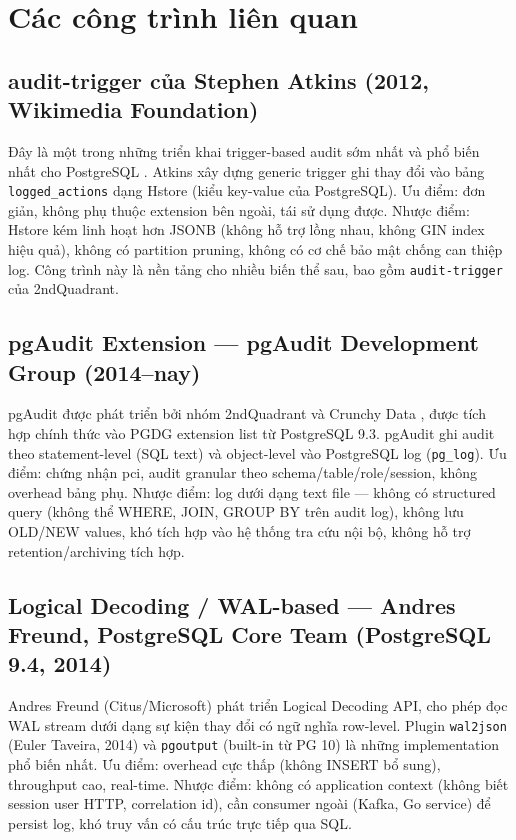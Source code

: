 \section{Các công trình liên quan}

\subsection{audit-trigger của Stephen Atkins (2012, Wikimedia Foundation)}

Đây là một trong những triển khai trigger-based audit sớm nhất và phổ biến nhất cho PostgreSQL \cite{Atkins2012}. Atkins xây dựng generic trigger ghi thay đổi vào bảng \texttt{logged\_actions} dạng Hstore (kiểu key-value của PostgreSQL). Ưu điểm: đơn giản, không phụ thuộc extension bên ngoài, tái sử dụng được. Nhược điểm: Hstore kém linh hoạt hơn JSONB (không hỗ trợ lồng nhau, không GIN index hiệu quả), không có partition pruning, không có cơ chế bảo mật chống can thiệp log. Công trình này là nền tảng cho nhiều biến thể sau, bao gồm \texttt{audit-trigger} của 2ndQuadrant.

\subsection{pgAudit Extension --- pgAudit Development Group (2014--nay)}

pgAudit được phát triển bởi nhóm 2ndQuadrant và Crunchy Data \cite{pgAudit}, được tích hợp chính thức vào PGDG extension list từ PostgreSQL 9.3. pgAudit ghi audit theo statement-level (SQL text) và object-level vào PostgreSQL log (\texttt{pg\_log}). Ưu điểm: chứng nhận \ac{pci}, audit granular theo schema/table/role/session, không overhead bảng phụ. Nhược điểm: log dưới dạng text file --- không có structured query (không thể WHERE, JOIN, GROUP BY trên audit log), không lưu OLD/NEW values, khó tích hợp vào hệ thống tra cứu nội bộ, không hỗ trợ retention/archiving tích hợp.

\subsection{Logical Decoding / WAL-based --- Andres Freund, PostgreSQL Core Team (PostgreSQL 9.4, 2014)}

Andres Freund (Citus/Microsoft) phát triển Logical Decoding API, cho phép đọc WAL stream dưới dạng sự kiện thay đổi có ngữ nghĩa row-level. Plugin \texttt{wal2json} (Euler Taveira, 2014) và \texttt{pgoutput} (built-in từ PG 10) là những implementation phổ biến nhất. Ưu điểm: overhead cực thấp (không INSERT bổ sung), throughput cao, real-time. Nhược điểm: không có application context (không biết session user HTTP, correlation id), cần consumer ngoài (Kafka, Go service) để persist log, khó truy vấn có cấu trúc trực tiếp qua SQL.

